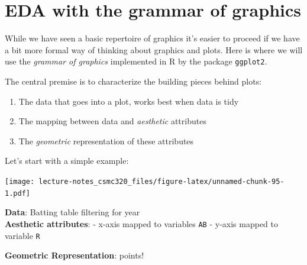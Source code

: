 \documentclass[12pt,]{book}
\newenvironment{Shaded}{\begin{snugshade}}{\end{snugshade}}
\newcommand{\KeywordTok}[1]{\textcolor[rgb]{0.13,0.29,0.53}{\textbf{#1}}}
\newcommand{\DataTypeTok}[1]{\textcolor[rgb]{0.13,0.29,0.53}{#1}}
\newcommand{\StringTok}[1]{\textcolor[rgb]{0.31,0.60,0.02}{#1}}
\newcommand{\CommentTok}[1]{\textcolor[rgb]{0.56,0.35,0.01}{\textit{#1}}}
\newcommand{\OperatorTok}[1]{\textcolor[rgb]{0.81,0.36,0.00}{\textbf{#1}}}
\newcommand{\NormalTok}[1]{#1}
\providecommand{\tightlist}{%
  \setlength{\itemsep}{0pt}\setlength{\parskip}{0pt}}
\theoremstyle{definition}
\theoremstyle{definition}
\theoremstyle{definition}
\theoremstyle{remark}
\begin{document}
\section{EDA with the grammar of
graphics}\label{eda-with-the-grammar-of-graphics}

While we have seen a basic repertoire of graphics it's easier to proceed
if we have a bit more formal way of thinking about graphics and plots.
Here is where we will use the \emph{grammar of graphics} implemented in
R by the package \texttt{ggplot2}.

The central premise is to characterize the building pieces behind plots:

\begin{enumerate}
\def\labelenumi{\arabic{enumi}.}
\tightlist
\item
  The data that goes into a plot, works best when data is tidy
\item
  The mapping between data and \emph{aesthetic} attributes
\item
  The \emph{geometric} representation of these attributes
\end{enumerate}

Let's start with a simple example:

\begin{Shaded}
\end{Shaded}

\texttt{[image: lecture-notes\_csmc320\_files/figure-latex/unnamed-chunk-95-1.pdf]}

\textbf{Data}: Batting table filtering for year\\
\textbf{Aesthetic attributes}: - x-axis mapped to variables \texttt{AB}
- y-axis mapped to variable \texttt{R}

\textbf{Geometric Representation}: points!
\end{document}
